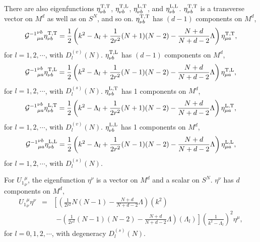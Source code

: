 \documentclass[a4paper,aps,preprint,groupedaddress,showpacs]{revtex4}
\begin{document}
There are also eigenfunctions $\eta^{\rm T,T}_{\nu b}$, 
$\eta^{\rm T,L}_{\nu b}$, $\eta^{\rm L,T}_{\nu b}$, and
$\eta^{\rm L,L}_{\nu b}$. $\eta^{\rm T,T}_{\nu b}$ is a transverse
vector on $M^{d}$ as well as on $S^{N}$, and so on. 
$\eta^{\rm T,T}_{\nu b}$ has $(d-1)$ components on $M^{d}$,
\begin{equation}
{{\cal G}^{-1}}^{\nu b}_{\mu a}\eta^{\rm T,T}_{\nu b}=
\frac{1}{2}\left(k^{2}-\Lambda_{l}+\frac{1}{2r^{2}}(N+1)(N-2)-
\frac{N+d}{N+d-2}\Lambda\right)\eta^{\rm T,T}_{\mu a},
\end{equation}
for $l=1,2,\cdots$, with $D^{(v)}_{l}(N)$.
$\eta^{\rm T,L}_{\nu b}$ has $(d-1)$ components on $M^{d}$,
\begin{equation}
{{\cal G}^{-1}}^{\nu b}_{\mu a}\eta^{\rm T,L}_{\nu b}=
\frac{1}{2}\left(k^{2}-\Lambda_{l}+\frac{1}{2r^{2}}(N-1)(N-2)-
\frac{N+d}{N+d-2}\Lambda\right)\eta^{\rm T,L}_{\mu a},
\end{equation}
for $l=1,2,\cdots$, with $D^{(s)}_{l}(N)$.
$\eta^{\rm L,T}_{\nu b}$ has 1 components on $M^{d}$,
\begin{equation}
{{\cal G}^{-1}}^{\nu b}_{\mu a}\eta^{\rm L,T}_{\nu b}=
\frac{1}{2}\left(k^{2}-\Lambda_{l}+\frac{1}{2r^{2}}(N+1)(N-2)-
\frac{N+d}{N+d-2}\Lambda\right)\eta^{\rm L,T}_{\mu a},
\end{equation}
for $l=1,2,\cdots$, with $D^{(v)}_{l}(N)$.
$\eta^{\rm L,L}_{\nu b}$ has 1 components on $M^{d}$,
\begin{equation}
{{\cal G}^{-1}}^{\nu b}_{\mu a}\eta^{\rm L,L}_{\nu b}=
\frac{1}{2}\left(k^{2}-\Lambda_{l}+\frac{1}{2r^{2}}(N-1)(N-2)-
\frac{N+d}{N+d-2}\Lambda\right)\eta^{\rm L,L}_{\mu a},
\end{equation}
for $l=1,2,\cdots$, with $D^{(s)}_{l}(N)$.

For ${U_{1}}^{\mu}_{\nu}$, the eigenfunction $\eta^{\nu}$ is a
vector on $M^{d}$ and a scalar on $S^{N}$. $\eta^{\nu}$ has
$d$ components on $M^{d}$,
\begin{eqnarray}
{U_{1}}^{\mu}_{\nu}\eta^{\nu}&=&
\left[\left(\frac{1}{2r^{2}}N(N-1)-
\frac{N+d}{N+d-2}\Lambda\right)(k^{2})\right.
\nonumber\\
&&\ \ \left.
-\left(\frac{1}{2r^{2}}(N-1)(N-2)-\frac{N+d}{N+d-2}\Lambda\right)
(\Lambda_{l})\right]
\left(\frac{1}{k^{2}-\Lambda_{l}}\right)^{2}\eta^{\mu},
\end{eqnarray}
for $l=0,1,2,\cdots$, with degeneracy $D^{(s)}_{l}(N)$. 
\end{document}
